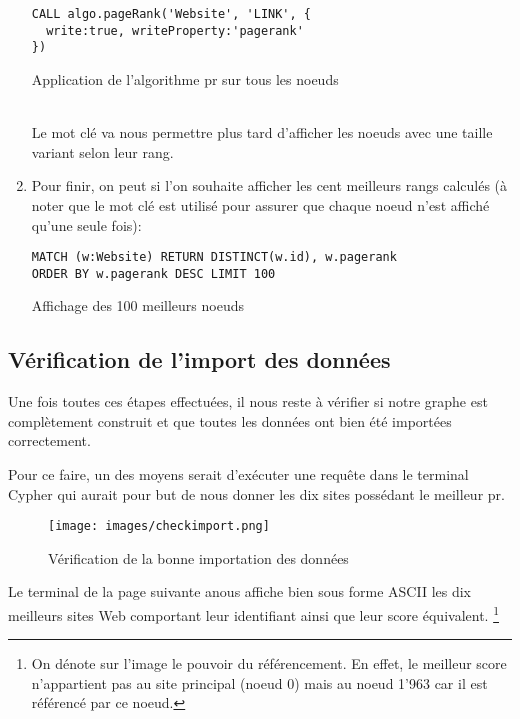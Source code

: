 \documentclass[12pt,twoside, openright]{memoir}
\newcommand{\courrier}[1]{{\fontfamily{qcr}\selectfont {#1}}}
\begin{document}
\begin{enumerate}
		\begin{listing}
			\begin{verbatim}
CALL algo.pageRank('Website', 'LINK', {
  write:true, writeProperty:'pagerank'
})
			\end{verbatim}
			\caption{Application de l'algorithme \gls{pr} sur tous les noeuds}
		\end{listing}\\
		Le mot clé \courrier{writeProperty} va nous permettre plus tard d'afficher les noeuds avec une taille variant selon leur rang.
		\item Pour finir, on peut si l'on souhaite afficher les cent meilleurs rangs calculés (à noter que le mot clé \courrier{DISTINCT} est utilisé pour assurer que chaque noeud n'est affiché qu'une seule fois):\vspace{-3pt}
		\begin{listing}
			\begin{verbatim}
MATCH (w:Website) RETURN DISTINCT(w.id), w.pagerank 
ORDER BY w.pagerank DESC LIMIT 100
			\end{verbatim}
			\caption{Affichage des 100 meilleurs noeuds}
		\end{listing}
	\end{enumerate}
	\subsection{Vérification de l'import des données}
	Une fois toutes ces étapes effectuées, il nous reste à vérifier si notre graphe est complètement construit et que toutes les données ont bien été importées correctement.\par
	Pour ce faire, un des moyens serait d'exécuter une requête dans le terminal Cypher qui aurait pour but de nous donner les dix sites possédant le meilleur \gls{pr}.
	\begin{figure}[!ht]
		\centering
		\texttt{[image: images/checkimport.png]}
		\caption{Vérification de la bonne importation des données}
	\end{figure}\par
	Le terminal de la page suivante anous affiche bien sous forme ASCII les dix meilleurs sites Web comportant leur identifiant ainsi que leur score équivalent. \footnote{On dénote sur l'image le pouvoir du référencement. En effet, le meilleur score n'appartient pas au site principal (noeud 0) mais au noeud 1'963 car il est référencé par ce noeud.}
\end{document}
